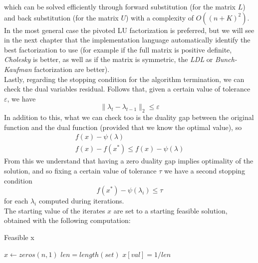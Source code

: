 \documentclass[notitlepage]{article}
\begin{document}
which can be solved efficiently through forward substitution (for the matrix $L$) and back substitution (for the matrix $U$) with a complexity of $O((n+K)^2)$.\\
In the most general case the pivoted LU factorization is preferred, but we will see in the next chapter that the implementation language automatically identify the best 
factorization to use (for example if the full matrix is positive definite, \textit{Cholesky} is better, as well as if the matrix is symmetric, the \textit{LDL} or \textit{Bunch-Kaufman} factorization are better).\\ 
Lastly, regarding the stopping condition for the algorithm termination, we can check the dual variables residual. Follows that, given a certain value of tolerance $\varepsilon$, we have %
\begin{equation}
    \|\lambda_{t} - \lambda_{t-1}\|_2 \le \varepsilon
  \label{eqn:stopping-condition}
\end{equation}
In addition to this, what we can check too is the duality gap between the original function and the dual function (provided that we know the optimal value), so
\begin{equation}
  \begin{gathered}
    f(x) - \psi(\lambda) \\
    f(x) - f(x^*) \le f(x) - \psi(\lambda)
    \label{eqn:dual-stopcondition}
  \end{gathered}
\end{equation}
From this we understand that having a zero duality gap implies optimality of the solution, and so fixing a certain value of tolerance $\tau$ we have a second stopping condition
\[
  f(x^*) - \psi(\lambda_i) \le \tau  
\] 
for each $\lambda_i$ computed during iterations.\\
The starting value of the iterates $x$ are set to a starting feasible solution, obtained with the following computation:

\begin{algorithm}[H]
  \caption{Feasible x}
  \label{alg:feasible-x}
  \begin{algorithmic}
      \State $x \gets zeros(n,1)$
        \State $len = length(set)$
          \State $x[val] = 1 / len$
        \EndFor
      \EndFor
    \EndProcedure
  \end{algorithmic}  
\end{algorithm}
\end{document}

